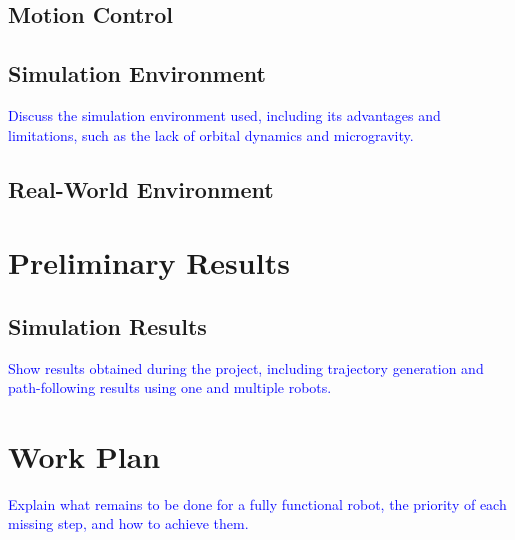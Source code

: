 \documentclass[a4paper, oneside]{article}
\begin{document}
\subsection{Motion Control}
    \subsection{Simulation Environment}
\textcolor{blue}{Discuss the simulation environment used, including its advantages and limitations, such as the lack of orbital dynamics and microgravity.}



\subsection{Real-World Environment}


\clearpage
\section{Preliminary Results}

\subsection{Simulation Results}
\textcolor{blue}{Show results obtained during the project, including trajectory generation and path-following results using one and multiple robots.}

\clearpage
\section{Work Plan}
\textcolor{blue}{Explain what remains to be done for a fully functional robot, the priority of each missing step, and how to achieve them.}

\nocite{*} %
\printbibliography[heading=bibintoc]

\appendix
\end{document}
